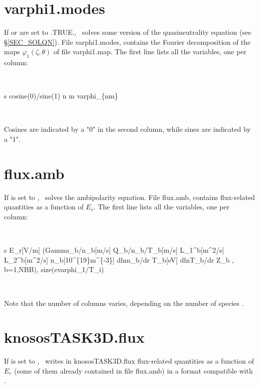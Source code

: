 
\section{{\ttfamily varphi1.modes}}

If  or   are set to {\ttfamily .TRUE.}, \KNOSOS~solves some version of the quasineutrality equation  (see \S\ref{SEC_SOLQN}). File {\ttfamily varphi1.modes},  contains the Fourier decomposition of the maps $\varphi_1(\zeta,\theta)$ of file {\ttfamily varphi1.map}. The first line lists all the variables, one per column:

\

{\ttfamily s  cosine(0)/sine(1)  n  m  \tbl varphi\_\{nm\}}

\

Cosines are indicated by a "0" in the second column, while sines are indicated by a "1".



\section{\ttfamily flux.amb}

If  is set to \true, \KNOSOS~solves the ambipolarity equation. File {\ttfamily flux.amb}, contains flux-related quantities as a function of $E_r$. The first line lists all the variables, one per column:

\

{\ttfamily s E\_r[V/m] (\tbl Gamma\_b/n\_b[m/s]  Q\_b/n\_b/T\_b[m/s]  L\_1\^{}b[m\^{}2/s] L\_2\^{}b[m\^{}2/s]  n\_b[10\^{}\{19\}m\^{}\{-3\}] dlnn\_b/dr T\_b[eV]  dlnT\_b/dr Z\_b , b=1,NBB), size(e\tbl varphi\_1/T\_i)}


\

Note that the number of columns varies, depending on the number of species .



\section{\ttfamily knososTASK3D.flux}

If  is set to \true, \KNOSOS~writes in {\ttfamily knososTASK3D.flux} flux-related quantities as a function of $E_r$ (some of them already contained in file {\ttfamily flux.amb}) in a format compatible with \TASKTD. %

